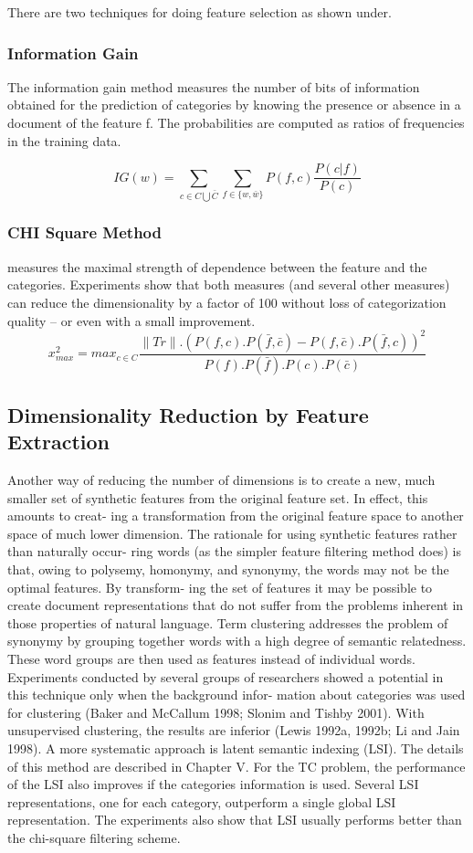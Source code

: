 \documentclass[12pt]{book}
\begin{document}
There are two techniques for doing feature selection as shown under.

\subsubsection{Information Gain}
The information gain method measures the number of bits of information obtained for the prediction of categories by knowing the presence or absence in a document of the feature f. The probabilities are computed as ratios of frequencies in the training data. 


$$IG(w) = \sum_{c \in C \bigcup \bar{C}} \sum_{f \in \{w, \bar{w}\}} P(f, c) \frac{P(c | f)}{P(c)}$$

\subsubsection{CHI Square Method}
 measures the maximal strength of dependence between the feature and the categories. Experiments show that both measures (and several other measures) can reduce the dimensionality by a factor of 100 without loss of categorization quality – or even with a small improvement.
 $$ x^2_{max}= max_{c \in C} \frac{\|Tr\| . (P(f, c) . P(\bar{f}, \bar{c}) - P(f, \bar{c}) . P(\bar{f}, c))^2}{P(f) . P(\bar{f}) . P(c) . P(\bar{c})} $$

\subsection{Dimensionality Reduction by Feature Extraction}
Another way of reducing the number of dimensions is to create a new, much smaller set of synthetic features from the original feature set. In effect, this amounts to creat- ing a transformation from the original feature space to another space of much lower dimension. The rationale for using synthetic features rather than naturally occur- ring words (as the simpler feature filtering method does) is that, owing to polysemy, homonymy, and synonymy, the words may not be the optimal features. By transform- ing the set of features it may be possible to create document representations that do not suffer from the problems inherent in those properties of natural language.
Term clustering addresses the problem of synonymy by grouping together words with a high degree of semantic relatedness. These word groups are then used as features instead of individual words. Experiments conducted by several groups of researchers showed a potential in this technique only when the background infor- mation about categories was used for clustering (Baker and McCallum 1998; Slonim and Tishby 2001). With unsupervised clustering, the results are inferior (Lewis 1992a, 1992b; Li and Jain 1998).
A more systematic approach is latent semantic indexing (LSI). The details of this method are described in Chapter V. For the TC problem, the performance of the LSI also improves if the categories information is used. Several LSI representations, one for each category, outperform a single global LSI representation. The experiments also show that LSI usually performs better than the chi-square filtering scheme.
\end{document}
